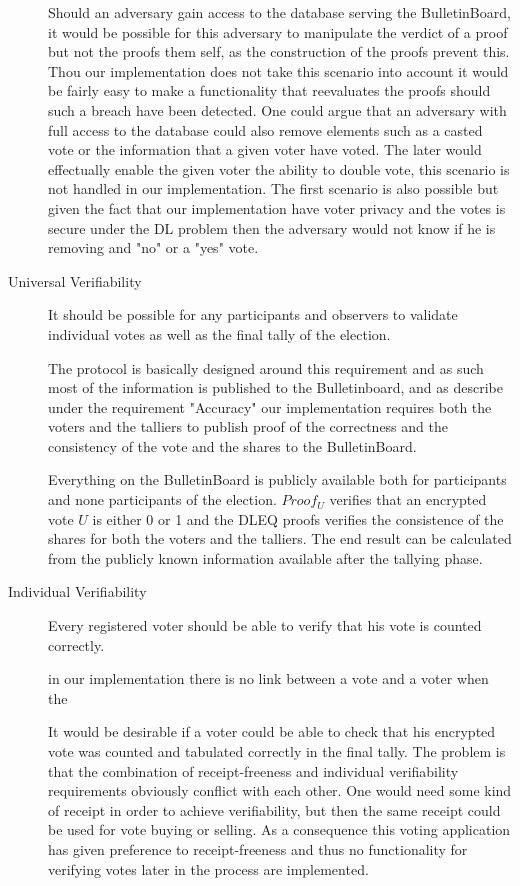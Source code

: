 \begin{description}
        \noindent
        Should an adversary gain access to the database serving the BulletinBoard, it would be possible for this adversary to manipulate the verdict of a proof but not
        the proofs them self, as the construction of the proofs prevent this. Thou our implementation does not take this scenario into account it would be fairly easy to make
        a functionality that reevaluates the proofs should such a breach have been detected. One could argue that an adversary with full access to the database could also remove elements such as a casted vote or the information that a given voter have voted. The later would effectually enable the given voter the ability to double vote, this scenario is not handled in our implementation. The first scenario is also possible but given the fact that our implementation have voter privacy and the votes is secure under the DL problem then the adversary would not know if he is removing and "no" or a "yes" vote. 
        
        
    \item[Universal Verifiability]
        It should be possible for any participants and observers to validate individual votes as well as the final tally of the election. 
        
        \noindent
        The protocol is basically designed around this requirement and as such most of the information is published to the Bulletinboard, and as describe under the requirement "Accuracy" our implementation requires both the voters and the talliers to publish proof of the correctness and the consistency of the vote and the shares to the BulletinBoard. 
        
        \noindent
        Everything on the BulletinBoard is publicly available both for participants and none participants of the election. $Proof_U$ verifies that an encrypted vote $U$ is either 0 or 1 and the DLEQ proofs verifies the consistence of the shares for both the voters and the talliers. The end result can be calculated from the publicly known information available after the tallying phase. 
            
    \item[Individual Verifiability]
        Every registered voter should be able to verify that his vote is counted correctly. 
        
        \noindent
        in our implementation there is no link between a vote and a voter when the  
        
        It would be desirable if a voter could be able to check that his encrypted vote
        was counted and tabulated correctly in the final tally. The problem is that
        the combination of receipt-freeness and individual verifiability requirements
        obviously conflict with each other. One would need some kind of receipt in
        order to achieve verifiability, but then the same receipt could be used for
        vote buying or selling. As a consequence this voting application has given
        preference to receipt-freeness and thus no functionality for verifying votes
        later in the process are implemented.
        

\end{description}

